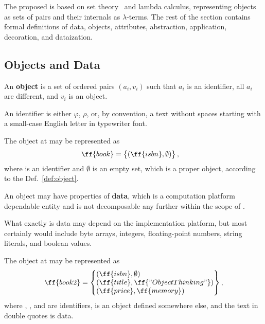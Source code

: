 The proposed \phic{} is based on set theory~\citep{jech2013set} and lambda calculus,
representing objects as sets of pairs and their internals as $\lambda$-terms.
The rest of the section contains formal definitions of
data, objects, attributes, abstraction, application, decoration, and dataization.

\subsection{Objects and Data}

\begin{eodefinition}\label{def:object}
An \textbf{object} is a set of ordered pairs $(a_i, v_i)$ such that
$a_i$ is an identifier, all $a_i$ are different, and $v_i$ is an object.
\end{eodefinition}

An identifier is either $\varphi$, $\rho$, or, by convention, a text without
spaces starting with a small-case English letter in typewriter font.

The object at  may be represented as
\begin{equation}\label{eq:book}
\begin{split}
\ff{book} & = \left\{\begin{matrix*}[l]
  (\ff{isbn}, \emptyset) \\
\end{matrix*}\right\},
\end{split}
\end{equation}
where  is an identifier and $\emptyset$ is an empty
set, which is a proper object, according to the Def.~\ref{def:object}.

\begin{eodefinition}\label{def:data}
An object may have properties of \textbf{data},
which is a computation platform dependable entity and is not
decomposable any further within the scope of \phic{}.
\end{eodefinition}

What exactly is data may depend on the
implementation platform, but most certainly would include
byte arrays, integers, floating-point numbers,
string literals, and boolean values.

The object at  may be represented as
\begin{equation}\label{eq:book2}
\begin{split}
\ff{book2} & = \left\{\begin{matrix*}[l]
  (\ff{isbn}, \emptyset) \\
  (\ff{title}, \ff{"Object Thinking"}) \\
  (\ff{price}, \ff{memory}) \\
\end{matrix*}\right\}, \\
\end{split}
\end{equation}
where , , and  are identifiers,
 is an object defined somewhere else,
and the text in double quotes is data.

